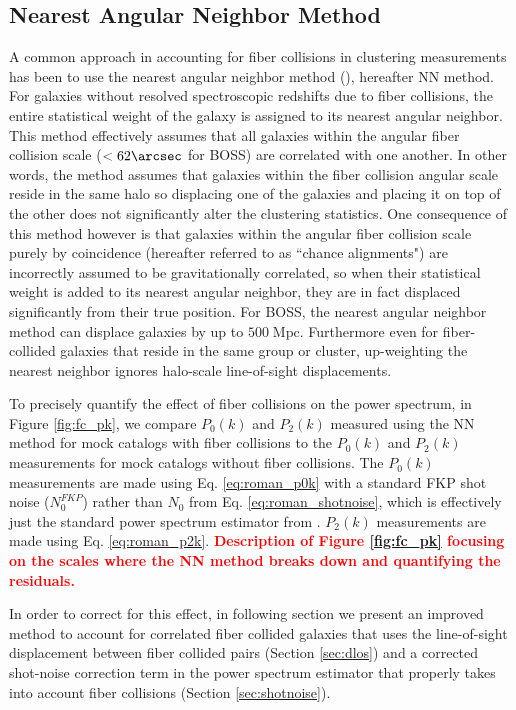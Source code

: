 \documentclass{emulateapj}
\newcommand{\todo}[1]{{\bf \textcolor{red}{ #1}}}
\begin{document}
\subsection{Nearest Angular Neighbor Method} \label{sec:fc_pk}
A common approach in accounting for fiber collisions in clustering measurements has been to use the nearest angular neighbor method (\citealt{Zehavi:2002aa, Berlind:2006aa, Anderson:2012aa}), hereafter NN method. For galaxies without resolved spectroscopic redshifts due to fiber collisions, the entire statistical weight of the galaxy is assigned to its nearest angular neighbor. This method effectively assumes that all galaxies within the angular fiber collision scale ($< 62 \arcsec$ for BOSS) are correlated with one another. In other words, the method assumes that galaxies within the fiber collision angular scale reside in the same halo so displacing one of the galaxies and placing it on top of the other does not significantly alter the clustering statistics. One consequence of this method however is that galaxies within the angular fiber collision scale purely by coincidence (hereafter referred to as ``chance alignments") are incorrectly assumed to be gravitationally correlated, so when their statistical weight is added to its nearest angular neighbor, they are in fact displaced significantly from their true position. For BOSS, the nearest angular neighbor method can displace galaxies by up to $500 \;\mathrm{Mpc}$. Furthermore even for fiber-collided galaxies that reside in the same group or cluster, up-weighting the nearest neighbor ignores halo-scale line-of-sight displacements. 

To precisely quantify the effect of fiber collisions on the power spectrum, in Figure \ref{fig:fc_pk}, we compare $P_0(k)$ and $P_2(k)$ measured using the NN method for mock catalogs with fiber collisions to the $P_0(k)$ and $P_2(k)$ measurements for mock catalogs without fiber collisions. The $P_0(k)$ measurements are made using Eq. \ref{eq:roman_p0k} with a standard FKP shot noise ($N_0^{FKP}$) rather than $N_0$ from Eq. \ref{eq:roman_shotnoise}, which is effectively just the standard power spectrum estimator from \cite{Feldman:1994aa}. $P_2(k)$ measurements are made using Eq. \ref{eq:roman_p2k}. \todo{Description of Figure \ref{fig:fc_pk} focusing on the scales where the NN method breaks down and quantifying the residuals.}


In order to correct for this effect, in following section we present an improved method to account for correlated fiber collided galaxies that uses the line-of-sight displacement between fiber collided pairs (Section \ref{sec:dlos}) and a corrected shot-noise correction term in the power spectrum estimator that properly takes into account fiber collisions (Section \ref{sec:shotnoise}). 
\end{document}
